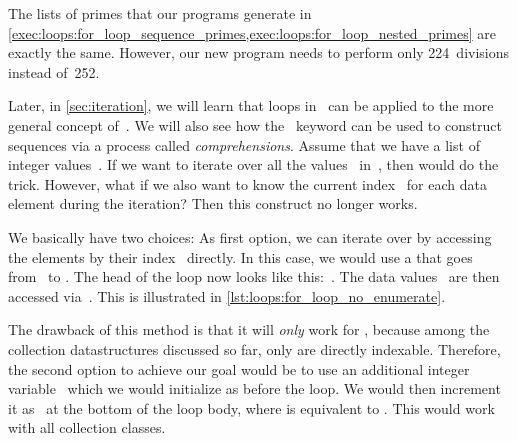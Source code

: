The lists of primes that our programs generate in \cref{exec:loops:for_loop_sequence_primes,exec:loops:for_loop_nested_primes} are exactly the same.
However, our new program needs to perform only 224~divisions instead of~252.

Later, in \cref{sec:iteration}, we will learn that loops in \python\ can be applied to the more general concept of~.
We will also see how the ~keyword can be used to construct sequences via a process called \emph{comprehensions}.%
%
\FloatBarrier%
\endhsection%
%
%
\label{sec:enumOverSequences}%
%
%
%
Assume that we have a list  of integer values~.
If we want to iterate over all the values~ in~, then  would do the trick.
However, what if we also want to know the current index~ for each data element during the iteration?
Then this construct no longer works.

We basically have two choices:
As first option, we can iterate over  by accessing the elements by their index~ directly.
In this case, we would use a  that goes from~ to .
The head of the loop now looks like this:~.
The data values~ are then accessed via~.
This is illustrated in \cref{lst:loops:for_loop_no_enumerate}.

The drawback of this method is that it will \emph{only} work for , because among the collection datastructures discussed so far, only  are directly indexable.
Therefore, the second option to achieve our goal would be to use an additional integer variable~ which we would initialize as  before the loop.
 We would then increment it as~ at the bottom of the loop body, where  is equivalent to \pythonIdx{+=}\pythonIdx{+}.
This would work with all collection classes.

